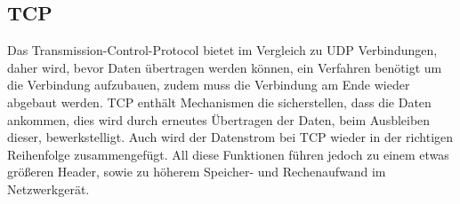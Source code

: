 \documentclass[a4paper,14pt,headsepline]{scrartcl}
\begin{document}
\subsection{TCP}
Das Transmission-Control-Protocol bietet im Vergleich zu UDP Verbindungen, daher wird, bevor Daten übertragen werden können, ein Verfahren benötigt um die Verbindung aufzubauen, zudem muss die Verbindung am Ende wieder abgebaut werden. TCP enthält Mechanismen die sicherstellen, dass die Daten ankommen, dies wird durch erneutes Übertragen der Daten, beim Ausbleiben dieser, bewerkstelligt. Auch wird der Datenstrom bei TCP wieder in der richtigen Reihenfolge zusammengefügt. All diese Funktionen führen jedoch zu einem etwas größeren Header, sowie zu höherem Speicher- und Rechenaufwand im Netzwerkgerät.
\begin{figure}[h]
\begin{center}
\end{center}
\end{figure}
\end{document}
